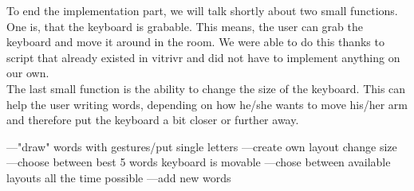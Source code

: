 To end the implementation part, we will talk shortly about two small functions. One is, that the keyboard is grabable. This means, the user can grab the keyboard and move it around in the room. We were able to do this thanks to script that already existed in vitrivr and did not have to implement anything on our own.\\
The last small function is the ability to change the size of the keyboard. This can help the user writing words, depending on how he/she wants to move his/her arm and therefore put the keyboard a bit closer or further away.



---"draw" words with gestures/put single letters
---create own layout
change size
---choose between best 5 words
keyboard is movable
---chose between available layouts all the time possible
---add new words
